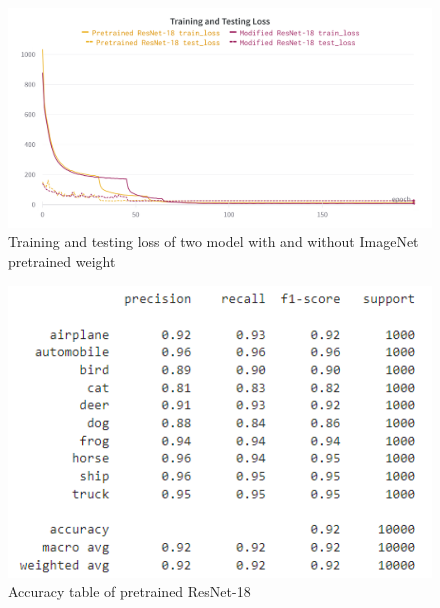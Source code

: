 \documentclass[twocolumn, draft]{extarticle}
\begin{document}
\begin{appendices}
\begin{figure}[H]
\centering
\includegraphics[width=0.9\linewidth]{charts/resnet-18-cifar-10-pretrained-loss}
\caption{Training and testing loss of two model with and without ImageNet pretrained weight}
\label{chart:resnet-18-cifar-10-pretrained-loss}
\end{figure}

\begin{figure}[H]
\centering
\includegraphics[width=0.9\linewidth]{charts/resnet-cifar-auc}
\caption{Accuracy table of pretrained ResNet-18}
\label{chart:resnet-cifar-auc}
\end{figure}


\end{appendices}
\end{document}
